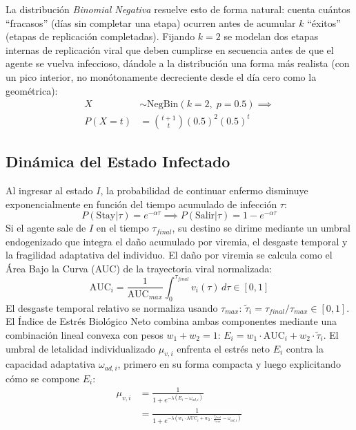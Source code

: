 \documentclass[conference]{IEEEtran}
\begin{document}
La distribución \emph{Binomial Negativa} resuelve esto de forma natural: cuenta cuántos ``fracasos'' (días sin completar una etapa) ocurren antes de acumular $k$ ``éxitos'' (etapas de replicación completadas). Fijando $k=2$ se modelan dos etapas internas de replicación viral que deben cumplirse en secuencia antes de que el agente se vuelva infeccioso, dándole a la distribución una forma más realista (con un pico interior, no monótonamente decreciente desde el día cero como la geométrica):
\begin{equation}
\begin{split}
X &\sim \text{NegBin}(k = 2,\; p = 0.5) \implies \\
P(X = t) &= \binom{t+1}{t} (0.5)^2 (0.5)^t
\end{split}
\end{equation}

\subsection{Dinámica del Estado Infectado}
Al ingresar al estado $I$, la probabilidad de continuar enfermo disminuye exponencialmente en función del tiempo acumulado de infección $\tau$:
\begin{equation}
P(\text{Stay}|\tau) = e^{-\alpha \tau} \implies P(\text{Salir}|\tau) = 1 - e^{-\alpha \tau}
\end{equation}
Si el agente sale de $I$ en el tiempo $\tau_{final}$, su destino se dirime mediante un umbral endogenizado que integra el daño acumulado por viremia, el desgaste temporal y la fragilidad adaptativa del individuo. El daño por viremia se calcula como el Área Bajo la Curva (AUC) de la trayectoria viral normalizada:
\begin{equation}
\text{AUC}_i = \frac{1}{\text{AUC}_{max}} \int_0^{\tau_{final}} v_i(\tau)\, d\tau \in [0, 1]
\end{equation}
El desgaste temporal relativo se normaliza usando $\tau_{max}$: $\tilde{\tau}_{i} = \tau_{final}/\tau_{max} \in [0, 1]$. El Índice de Estrés Biológico Neto combina ambas componentes mediante una combinación lineal convexa con pesos $w_1 + w_2 = 1$: $E_i = w_1 \cdot \text{AUC}_i + w_2 \cdot \tilde{\tau}_i$. El umbral de letalidad individualizado $\mu_{v,i}$ enfrenta el estrés neto $E_i$ contra la capacidad adaptativa $\omega_{ad,i}$, primero en su forma compacta y luego explicitando cómo se compone $E_i$:
\begin{equation}
\begin{split}
\mu_{v,i} &= \frac{1}{1 + e^{-\lambda(E_i - \omega_{ad,i})}} \\
&= \frac{1}{1 + e^{-\lambda\left(w_1 \cdot \text{AUC}_i + w_2 \cdot \frac{\tau_{final}}{\tau_{max}} - \omega_{ad,i}\right)}}
\end{split}
\end{equation}
\end{document}
